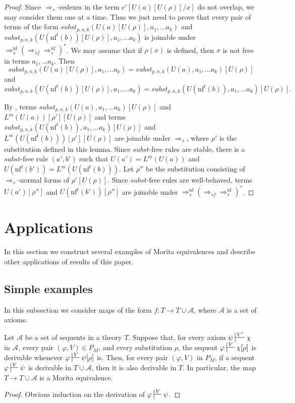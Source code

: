 \documentclass[reqno]{amsart}
\theoremstyle{definition}
\theoremstyle{remark}
\newcommand{\nf}{\mathrm{nf}}
\newcommand{\subst}{\mathit{subst}}
\numberwithin{figure}{section}
\begin{document}
\begin{proof}
Since $\Rightarrow_s$-redexes in the term $c'[U(a)[U(\rho)]/x]$ do not overlap, we may consider them one at a time.
Thus we just need to prove that every pair of terms of the form $\subst_{p,n,k}(U(a)[U(\rho)], a_1, \ldots a_k)$ and $\subst_{p,n,k}(U(\nf^t(b))[U(\rho)], a_1, \ldots a_k)$ is joinable under $\Rightarrow_s^\nf (\Rightarrow_{sf} \Rightarrow_s^\nf)^*$.
We may assume that if $\rho(x)$ is defined, then $x$ is not free in terms $a_1$, \ldots $a_k$.
Then
\[ \subst_{p,n,k}(U(a)[U(\rho)], a_1, \ldots a_k) = \subst_{p,n,k}(U(a), a_1, \ldots a_k)[U(\rho)] \]
and
\[ \subst_{p,n,k}(U(\nf^t(b))[U(\rho)], a_1, \ldots a_k) = \subst_{p,n,k}(U(\nf^t(b)), a_1, \ldots a_k)[U(\rho)]. \]

By , terms $\subst_{p,n,k}(U(a), a_1, \ldots a_k)[U(\rho)]$ and $L^m(U(a))[\rho'][U(\rho)]$ and terms $\subst_{p,n,k}(U(\nf^t(b)), a_1, \ldots a_k)[U(\rho)]$ and $L^m(U(\nf^t(b)))[\rho'][U(\rho)]$ are joinable under $\Rightarrow_s$,
where $\rho'$ is the substitution defined in this lemma.
Since $\subst$-free rules are stable, there is a $\subst$-free rule $(a',b')$ such that $U(a') = L^m(U(a))$ and $U(\nf^t(b')) = L^m(U(\nf^t(b)))$.
Let $\rho''$ be the substitution consisting of $\Rightarrow_s$-normal forms of $\rho'[U(\rho)]$.
Since $\subst$-free rules are well-behaved, terms $U(a')[\rho'']$ and $U(\nf^t(b'))[\rho'']$ are joinable under $\Rightarrow_s^\nf (\Rightarrow_{sf} \Rightarrow_s^\nf)^*$.
\end{proof}

\section{Applications}
\label{sec:applications}

In this section we construct several examples of Morita equivalences and describe other applications of results of this paper.

\subsection{Simple examples}
\label{sec:simp-applications}

In this subsection we consider maps of the form $f : T \to T \cup \mathcal{A}$, where $\mathcal{A}$ is a set of axioms.

\begin{prop}
Let $\mathcal{A}$ be a set of sequents in a theory $T$.
Suppose that, for every axiom $\psi \sststile{}{V'} \chi$ in $\mathcal{A}$, every pair $(\varphi,V) \in P_M$, and every substitution $\rho$,
the sequent $\varphi \sststile{}{V} \chi[\rho]$ is derivable whenever $\varphi \sststile{}{V} \psi[\rho]$ is.
Then, for every pair $(\varphi,V)$ in $P_M$, if a sequent $\varphi \sststile{}{V} \psi$ is derivable in $T \cup \mathcal{A}$, then it is also derivable in $T$.
In particular, the map $T \to T \cup \mathcal{A}$ is a Morita equivalence.
\end{prop}
\begin{proof}
Obvious induction on the derivation of $\varphi \sststile{}{V} \psi$.
\end{proof}
\end{document}
